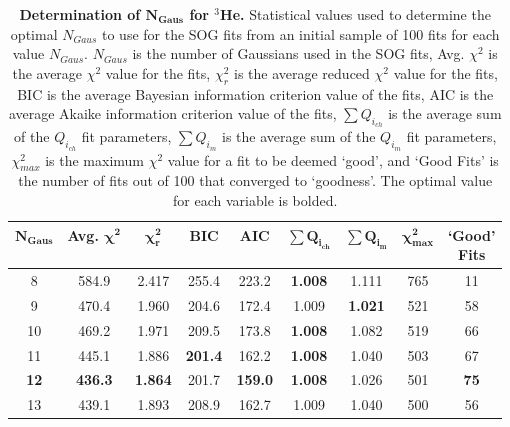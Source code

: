 \vspace{6mm}
\begin{table}[!h]
\centering
\begin{tabular}{|c c c c c c c c c|}
\hline
\textbf{$\boldsymbol{N_{Gaus}}$} & \textbf{Avg. $\boldsymbol{\chi^2}$} & \textbf{$\boldsymbol{\chi^2_r}$} & \textbf{BIC} & \textbf{AIC} & \textbf{$\boldsymbol{\sum Q_{i_{ch}}}$} & \textbf{$\boldsymbol{\sum Q_{i_{m}}}$} & \textbf{$\boldsymbol{\chi^2_{max}}$} & \makecell{\textbf{`Good'}\\ \textbf{Fits}} \\
\hline
8 & 584.9 & 2.417 & 255.4 & 223.2 & \textbf{1.008} & 1.111 & 765 & 11 \\
9 & 470.4 & 1.960 & 204.6 & 172.4 & 1.009 & \textbf{1.021} & 521 & 58 \\
10 & 469.2 & 1.971 & 209.5 & 173.8 & \textbf{1.008} & 1.082 & 519 & 66 \\
11 & 445.1 & 1.886 & \textbf{201.4} & 162.2 & \textbf{1.008} & 1.040 & 503 & 67 \\
\textbf{12} & \textbf{436.3} & \textbf{1.864} & 201.7 & \textbf{159.0} & \textbf{1.008} & 1.026 & 501 & \textbf{75} \\
13 & 439.1 & 1.893 & 208.9 & 162.7 & 1.009 & 1.040 & 500 & 56 \\
\hline
\end{tabular}
\caption[Determination of $N_{Gaus}$ for $^3$He]{{\bf{Determination of $\boldsymbol{N_{Gaus}}$ for $^3$He.}} Statistical values used to determine the optimal $N_{Gaus}$ to use for the SOG fits from an initial sample of 100 fits for each value $N_{Gaus}$. $N_{Gaus}$ is the number of Gaussians used in the SOG fits, Avg. $\chi^2$ is the average $\chi^2$ value for the fits, $\chi^2_r$ is the average reduced $\chi^2$ value for the fits, BIC is the average Bayesian information criterion value of the fits, AIC is the average Akaike information criterion value of the fits, $\sum Q_{i_{ch}}$ is the average sum of the $Q_{i_{ch}}$ fit parameters, $\sum Q_{i_{m}}$ is the average sum of the $Q_{i_{m}}$ fit parameters, $\chi^2_{max}$ is the maximum $\chi^2$ value for a fit to be deemed `good', and `Good Fits' is the number of fits out of 100 that converged to `goodness'. The optimal value for each variable is bolded.}
\label{tab:3he_ngaus}
\end{table}

